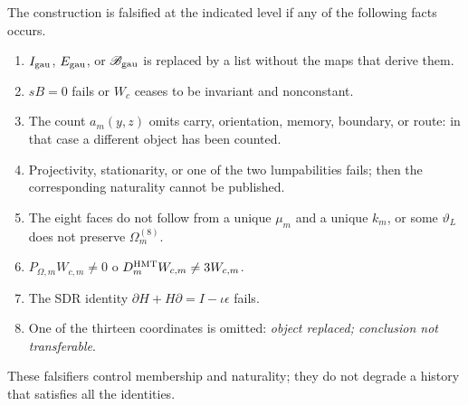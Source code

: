 \begin{ablation}
\label{abl:gauint-falsadores}
The construction is falsified at the indicated level if any of the
following facts occurs.
\begin{enumerate}
 \item \(I_{\rm gau}\), \(E_{\rm gau}\), or
 \(\mathscr B_{\rm gau}\) is replaced by a list without the maps that derive them.
 \item \(sB=0\) fails or \(W_c\) ceases to be invariant and nonconstant.
 \item The count \(a_m(y,z)\) omits carry, orientation, memory, boundary, or
 route: in that case a different object has been counted.
 \item Projectivity, stationarity, or one of the two
 lumpabilities fails; then the corresponding naturality cannot be published.
 \item The eight faces do not follow from a unique \(\mu_m\) and a unique
 \(k_m\), or some \(\vartheta_L\) does not preserve \(\Omega_m^{(8)}\).
 \item \(P_{\Omega,m}W_{c,m}\ne0\) o
 \(D_m^{\rm HMT}W_{c,m}\ne3W_{c,m}\).
 \item The SDR identity \(\partial H+H\partial=I-\iota\epsilon\) fails.
 \item One of the thirteen coordinates is omitted: \emph{object replaced;
 conclusion not transferable}.
\end{enumerate}
These falsifiers control membership and naturality; they do not degrade a
history that satisfies all the identities.
\end{ablation}
\fi
